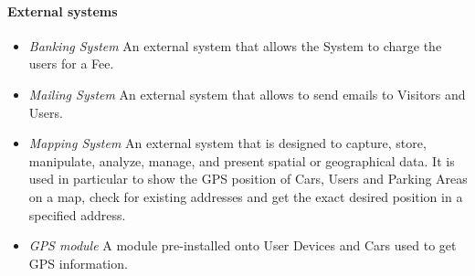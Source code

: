 \paragraph{External systems}
\begin{itemize}
	\item \emph{Banking System}
	An external system that allows the System to charge the users for a Fee.
		
	\item \emph{Mailing System}
	An external system that allows to send emails to Visitors and Users.
	
	\item \emph{Mapping System}
	An external system that is designed to capture, store, manipulate, analyze, manage, and present spatial or geographical data. 
	It is used in particular to show the GPS position of Cars, Users and Parking Areas on a map, check for existing addresses and get the exact desired position in a specified address.
	
	\item \emph{GPS module}
	A module pre-installed onto User Devices and Cars used to get GPS information.
\end{itemize}
	
